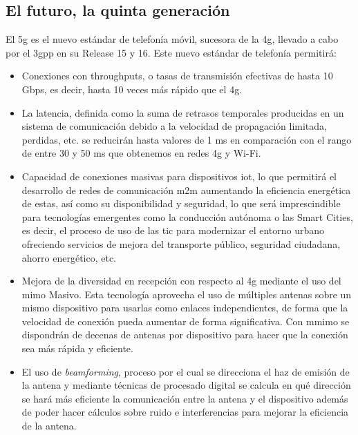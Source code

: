 \subsection{El futuro, la quinta generación}
\par El \gls{5g} es el nuevo estándar de telefonía móvil, sucesora de la \gls{4g}, llevado a cabo por el \gls{3gpp} en su Release 15 y 16. Este nuevo estándar de telefonía permitirá: \cite{3GPP2019, Gemalto2019, MINECO2019}
\\
\begin{itemize}
\item Conexiones con throughputs, o tasas de transmisión efectivas de hasta 10 Gbps, es decir, hasta 10 veces más rápido que el \gls{4g}.
\item La latencia, definida como la suma de retrasos temporales producidas en un sistema de comunicación debido a la velocidad de propagación limitada, perdidas, etc. se reducirán hasta valores de 1 ms en comparación con el rango de entre 30 y 50 ms que obtenemos en redes \gls{4g} y Wi-Fi.
\item Capacidad de conexiones masivas para dispositivos \gls{iot}, lo que permitirá  el desarrollo de redes de comunicación \gls{m2m} aumentando la eficiencia energética de estas, así como su disponibilidad y seguridad, lo que será imprescindible para tecnologías emergentes como la conducción autónoma o las Smart Cities, es decir, el proceso de uso de las \gls{tic} para modernizar el entorno urbano ofreciendo servicios de mejora del transporte público, seguridad ciudadana, ahorro energético, etc.
\item Mejora de la diversidad en recepción con respecto al \gls{4g} mediante el uso del \gls{mimo} Masivo. Esta tecnología aprovecha el uso de múltiples antenas sobre un mismo dispositivo para usarlas como enlaces independientes, de forma que la velocidad de conexión pueda aumentar de forma significativa. Con \gls{mmimo} se dispondrán de decenas de antenas por dispositivo para hacer que la conexión sea más rápida y eficiente.
\item El uso de \textit{beamforming}, proceso por el cual se direcciona el haz de emisión de la antena y mediante técnicas de procesado digital se calcula en qué dirección se hará más eficiente la comunicación entre la antena y el dispositivo además de poder hacer cálculos sobre ruido e interferencias para mejorar la eficiencia de la antena.
\end{itemize}

